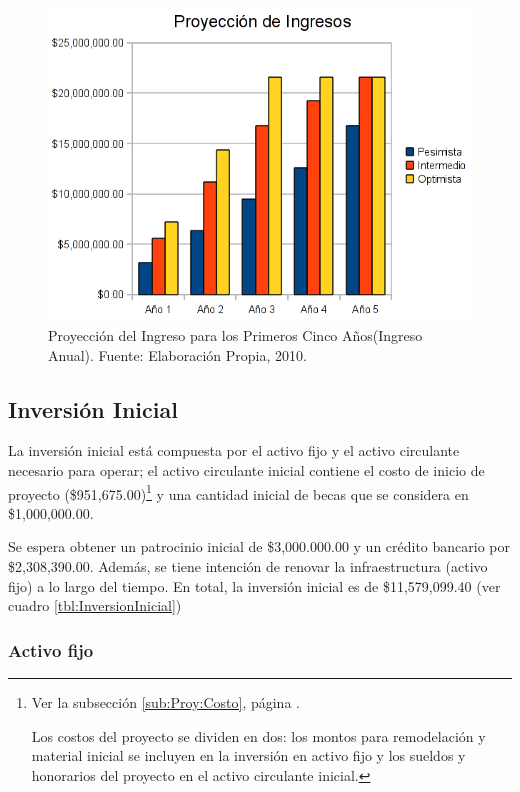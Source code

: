 \begin{figure}
	\centering
	\includegraphics[scale=0.7]{images/proyeccion_ingresos}
	\caption{Proyecci\'on del Ingreso para los Primeros Cinco Años\newline (Ingreso Anual). Fuente: Elaboración Propia, 2010.}
	\label{fig:ProyeccionIngresos}
\end{figure}

\subsection{Inversión Inicial}

La inversión inicial está compuesta por el activo fijo y el activo circulante necesario para operar; el activo circulante inicial contiene el costo de inicio de proyecto (\$951,675.00)\footnote{Ver la subsección \ref{sub:Proy:Costo}, página \pageref{sub:Proy:Costo}.

Los costos del proyecto se dividen en dos: los montos para remodelación y material inicial se incluyen en la inversión en activo fijo y los sueldos y honorarios del proyecto en el activo circulante inicial.} y una cantidad inicial de becas que se considera en \$1,000,000.00.

Se espera obtener un patrocinio inicial de \$3,000.000.00 y un crédito bancario por \$2,308,390.00. Además, se tiene intención de renovar la infraestructura (activo fijo) a lo largo del tiempo. En total, la inversión inicial es de \$11,579,099.40 (ver cuadro \ref{tbl:InversionInicial})



\subsubsection{Activo fijo}

